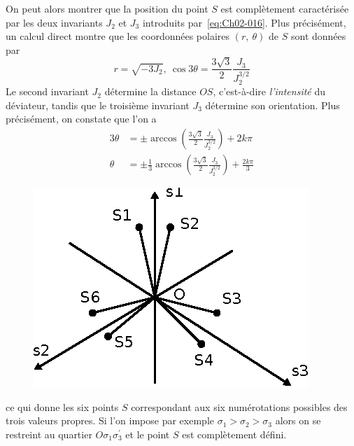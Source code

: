 On peut alors montrer que la position du point $S$ est complètement caractérisée par les deux invariants $J_2$ et $J_3$ introduits par~\eqref{eq:Ch02-016}.
Plus précisément, un calcul direct montre que les coordonnées polaires $\left( r,\ \theta \right)$ de $S$ sont données par 
\begin{equation}
    r = \sqrt{-3J_2},\ \cos 3 \theta = \frac{3\sqrt{3}}{2}\frac{J_3}{J_2^{3/2}}
    \label{eq:Ch02-029}
\end{equation}
Le second invariant $J_2$ détermine la distance $OS$, c'est-à-dire \emph{l'intensité} du déviateur, tandis que le troisième invariant $J_3$ détermine son orientation. 
Plus précisément, on constate que l'on a 
\begin{align}
    3\theta &= \pm \arccos \left( \frac{3\sqrt{3}}{2} \frac{J_3}{J_2^{3/2}} \right) + 2 k \pi\nonumber\\
    \theta &= \pm \frac{1}{3}\arccos \left( \frac{3\sqrt{3}}{2} \frac{J_3}{J_2^{3/2}} \right) + \frac{2 k \pi}{3}
    \label{eq:Ch02-030}
\end{align}
\begin{figure}
    \begin{center}
        \includegraphics{../images/T1_Ch02-0014}
    \end{center}
\end{figure}
ce qui donne les six points $S$ correspondant aux six numérotations possibles des trois valeurs propres. 
Si l'on impose par exemple $\sigma_1 > \sigma_2 > \sigma_3$ alors on se restreint au quartier $O\sigma_1\sigma_3^{\prime}$ et le point $S$ est complètement défini. 

